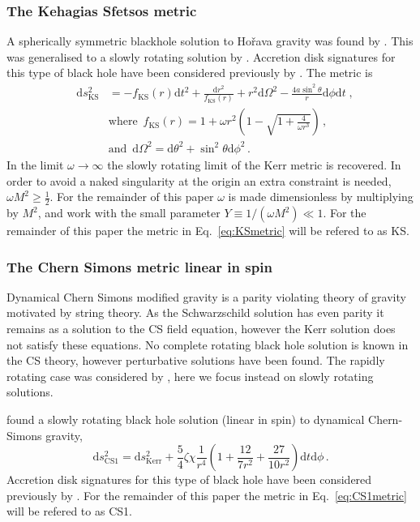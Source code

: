 \subsubsection{The Kehagias Sfetsos metric}\label{subsec:KS}
A spherically symmetric blackhole solution to Ho\v{r}ava gravity \citep{2009PhRvL.102p1301H,2009PhRvD..79h4008H} was found by \cite{2009PhLB..678..123K}. This was generalised to a slowly rotating solution by \cite{2010EPJC...70..367L}. Accretion disk signatures for this type of black hole have been considered previously by \cite{2011CQGra..28p5001H}. The metric is
\begin{eqnarray}\label{eq:KSmetric} 
&\textrm{d}s^{2}_{\textrm{KS}}&=-f_{\textrm{KS}}(r)\textrm{d}t^{2}+\frac{\textrm{d}r^{2}}{f_{\textrm{KS}}(r)}+r^{2}\textrm{d}\Omega^{2}-\frac{4a\sin^{2}\theta}{r}\textrm{d}\phi\textrm{d}t\; , \nonumber\\
&&\textrm{where }\, f_{\textrm{KS}}(r)=1+\omega r^{2}\left(1-\sqrt{1+\frac{4}{\omega r^{3}}}\right)\,, \nonumber \\
&&\textrm{and }\,\textrm{d}\Omega^{2}=\textrm{d}\theta^{2}+\sin^{2}\theta\textrm{d}\phi^{2}\, .\end{eqnarray}
In the limit $\omega \rightarrow \infty$ the slowly rotating limit of the Kerr metric is recovered. In order to avoid a naked singularity at the origin an extra constraint is needed, $\omega M^{2} \geq \frac{1}{2}$. For the remainder of this paper $\omega$ is made dimensionless by multiplying by $M^{2}$, and work with the small parameter $Y\equiv 1/(\omega M^{2})\ll 1$. For the remainder of this paper the metric in Eq.\ \ref{eq:KSmetric} will be refered to as KS.


\subsubsection{The Chern Simons metric linear in spin}\label{subsec:CS1}
Dynamical Chern Simons modified gravity \cite{2003PhRvD..68j4012J} is a parity violating theory of gravity motivated by string theory. As the Schwarzschild solution has even parity it remains as a solution to the CS field equation, however the Kerr solution does not satisfy these equations. No complete rotating black hole solution is known in the CS theory, however perturbative solutions have been found. The rapidly rotating case was considered by \cite{2014arXiv1407.2350S}, here we focus instead on slowly rotating solutions.

\cite{2009PhRvD..79h4043Y} found a slowly rotating black hole solution (linear in spin) to dynamical Chern-Simons gravity,
\begin{equation}\label{eq:CS1metric} \textrm{d}s^{2}_{\textrm{CS}1}=\textrm{d}s^{2}_{\textrm{Kerr}}+\frac{5}{4}\zeta\chi\frac{1}{r^{4}}\left(1+\frac{12}{7r^{2}}+\frac{27}{10r^{2}}\right)\textrm{d}t\textrm{d}\phi \, .\end{equation}
Accretion disk signatures for this type of black hole have been considered previously by \cite{2010CQGra..27j5010H}. For the remainder of this paper the metric in Eq.\ \ref{eq:CS1metric} will be refered to as CS1.

